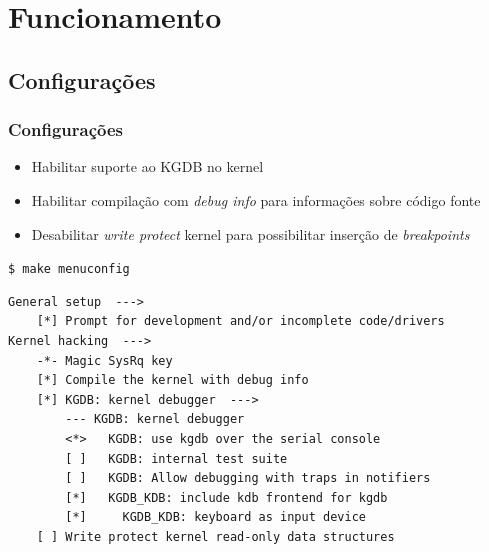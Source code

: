\documentclass[xcolor=pdftex,dvipsnames,table]{beamer}
\begin{document}
\section{Funcionamento}
\subsection{Configurações}
\begin{frame}[fragile]
	\frametitle{Configurações}
	\begin{center}
	\begin{itemize}
		\item Habilitar suporte ao KGDB no kernel
		\item Habilitar compilação com \textit{debug info} para informações sobre código fonte
		\item Desabilitar \textit{write protect} kernel para possibilitar inserção de \textit{breakpoints}
	\end{itemize}
	\begin{block}{{\tt \$ make menuconfig}}
	\tiny
	\begin{verbatim}
General setup  --->
    [*] Prompt for development and/or incomplete code/drivers
Kernel hacking  --->
    -*- Magic SysRq key
    [*] Compile the kernel with debug info
    [*] KGDB: kernel debugger  --->
        --- KGDB: kernel debugger
        <*>   KGDB: use kgdb over the serial console
        [ ]   KGDB: internal test suite
        [ ]   KGDB: Allow debugging with traps in notifiers
        [*]   KGDB_KDB: include kdb frontend for kgdb
        [*]     KGDB_KDB: keyboard as input device
    [ ] Write protect kernel read-only data structures
	\end{verbatim}
	\normalsize
	\end{block}
	\end{center}
\end{frame}
\end{document}
